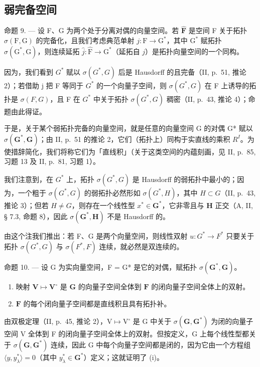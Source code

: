 \subsection{弱完备空间}

命题 9. --- 设 F、G 为两个处于分离对偶的向量空间。若 \(\hat{\mathbf{F}}\) 是空间 F 关于拓扑 \(\sigma(\mathrm{F},\mathrm{G})\) 的完备化，且我们考虑典范单射 \(j:\mathrm{F}\to\mathrm{G}^{*}\)，其中 \(\mathrm{G}^{*}\) 赋拓扑 \(\sigma(\mathrm{G}^{*},\mathrm{G})\)，则连续延拓 \(\hat{j}:\hat{\mathrm{F}}\to\mathrm{G}^{*}\)（延拓自 \(j\)）是拓扑向量空间的一个同构。

因为，我们看到 \(G^{*}\) 赋以 \(\sigma(G^{*}, G)\) 后是 Hausdorff 的且完备（II, p.~51, 推论 2）；若借助 j 把 F 等同于 \(G^{*}\) 的一个向量子空间，则 \(\sigma(G^{*}, G)\) 在 F 上诱导的拓扑是 \(\sigma(F, G)\)，且 F 在 \(G^{*}\) 中关于拓扑 \(\sigma(G^{*}, G)\) 稠密（II, p.~43, 推论 4）；命题由此得证。

于是，关于某个弱拓扑完备的向量空间，就是任意的向量空间 G 的对偶 G* 赋以 \(\sigma(\mathbf{G}^{*}, \mathbf{G})\)；由 II, p.~51 的推论 2，它们（拓扑上）同构于实直线的乘积 \(R^{I}\)。为使措辞简化，我们将称它们为「直线积」（关于这类空间的内蕴刻画，见 II, p.~85, 习题 13 及 II, p.~81, 习题 1）。

我们注意到，在 \(G^{*}\) 上，拓扑 \(\sigma(G^{*}, G)\) 是 Hausdorff 的弱拓扑中最小的；因为，一个粗于 \(\sigma(G^{*}, G)\) 的弱拓扑必然形如 \(\sigma(G^{*}, H)\)，其中 \(H \subset G\)（II, p.~43, 推论 3）；但若 \(H \neq G\)，则存在一个线性型 \(x^{*} \in \mathbf{G}^{*}\)，它非零且与 \(\mathbf{H}\) 正交（A, II, § 7.3, 命题 8），因此 \(\sigma(\mathbf{G}^{*}, \mathbf{H})\) 不是 Hausdorff 的。

由这个注我们推出：若 F、G 是两个向量空间，则线性双射 \(u:G^{*}\to F^{*}\) 只要关于拓扑 \(\sigma(G^{*},G)\) 与 \(\sigma(F^{*},F)\) 连续，就必然是双连续的。

命题 10. --- 设 G 为实向量空间，F = G* 是它的对偶，赋拓扑 \(\sigma(\mathbf{G}^*, \mathbf{G})\)。

\begin{enumerate}
\def\labelenumi{(\roman{enumi})}
\item
  映射 \(\mathbf{V} \mapsto \mathbf{V}^{\circ}\) 是 \(\mathbf{G}\) 的向量子空间全体到 \(\mathbf{F}\) 的闭向量子空间全体上的双射。
\item
  \(\mathbf{F}\) 的每个闭向量子空间都是直线积且具有拓扑补。
\end{enumerate}

由双极定理（II, p.~45, 推论 2），\(\mathrm{V} \mapsto \mathrm{V}^{\circ}\) 是 G 中关于 \(\sigma(\mathbf{G}, \mathbf{G}^{*})\) 为闭的向量子空间 V 全体到 F 的闭向量子空间全体上的双射。但按定义，G 上每个线性型都关于 \(\sigma(\mathbf{G}, \mathbf{G}^{*})\) 连续，因此 G 中每个向量子空间都是闭的，因为它由一个方程组 \(\langle y, y_{\lambda}^{*} \rangle = 0\)（其中 \(y_{\lambda}^{*} \in \mathbf{G}^{*}\)）定义；这就证明了 (i)。

